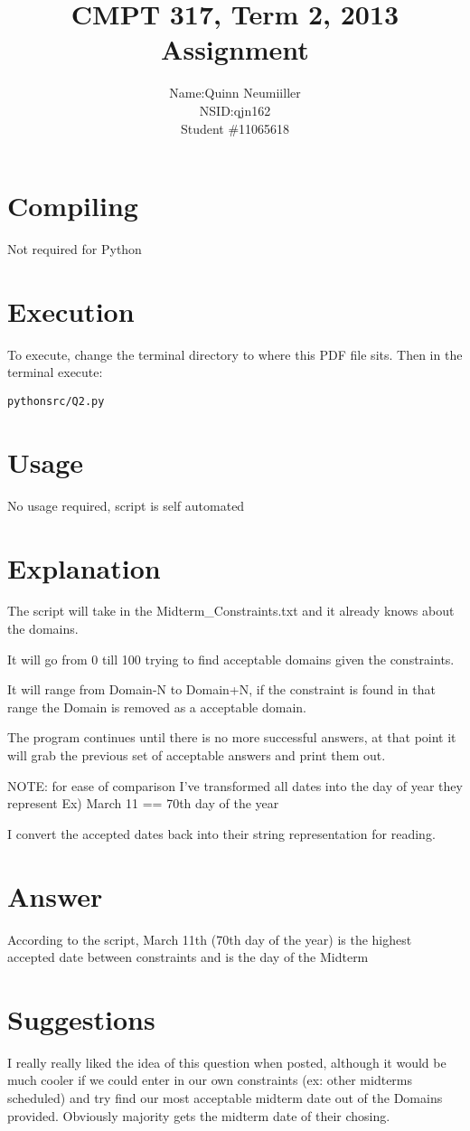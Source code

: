 \documentclass{article}
\title{CMPT 317, Term 2, 2013\\
Assignment \AssignmentNum\\
\AssignmentTitle
}
\author{
	\begin{tabular}{ l r }
	  Name: & Quinn Neumiiller \\
	  NSID: & qjn162 \\
	  Student \# & 11065618 \\
	\end{tabular}
}
\date{\AssignmentDate}
\newcommand{\QuestionNum}{2}
\begin{document}
   \maketitle
   
   \section{Compiling}
   Not required for Python

   \section{Execution}
   To execute, change the terminal directory to where this PDF file sits.
   Then in the terminal execute:
	\begin{alltt}
	python src/Q\QuestionNum.py
	\end{alltt}

  \section{Usage}
    No usage required, script is self automated
  \section{Explanation}
    The script will take in the Midterm\_Constraints.txt and it already knows about the domains.

    It will go from 0 till 100 trying to find acceptable domains given the constraints.

    It will range from Domain-N to Domain+N, if the constraint is found in that range the
    Domain is removed as a acceptable domain.

    The program continues until there is no more successful answers, at that point it will grab the previous
    set of acceptable answers and print them out.

    NOTE: for ease of comparison I've transformed all dates into the day of year they represent
    Ex) March 11 == 70th day of the year

    I convert the accepted dates back into their string representation for reading.
  \section{Answer}
    According to the script, March 11th (70th day of the year) is the highest accepted 
    date between constraints and is the day of the Midterm

  \section{Suggestions}
    I really really liked the idea of this question when posted, although it would be much cooler
    if we could enter in our own constraints (ex: other midterms scheduled) and try find our most
    acceptable midterm date out of the Domains provided. Obviously majority gets the midterm date of their chosing.
\end{document}
